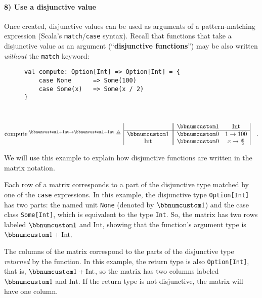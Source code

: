 \paragraph{8) Use a disjunctive value}

Once created, disjunctive values can be used as arguments of a pattern-matching
expression (Scala\textsf{'}s \lstinline!match!/\lstinline!case! syntax).
Recall that functions that take a disjunctive value as an argument
(\textsf{``}\textbf{disjunctive functions}\textsf{''})
may be also written \emph{without} the \lstinline!match! keyword:

\begin{wrapfigure}{l}{0.5\columnwidth}%
\vspace{-0.65\baselineskip}
\begin{lstlisting}
val compute: Option[Int] => Option[Int] = {
    case None      => Some(100)
    case Some(x)   => Some(x / 2)
}
\end{lstlisting}

\vspace{-1.65\baselineskip}
\end{wrapfigure}%

~\vspace{-1.45\baselineskip}
\[
\text{compute}^{:\bbnum 1+\text{Int}\rightarrow\bbnum 1+\text{Int}}\triangleq\,\begin{array}{|c||cc|}
 & \bbnum 1 & \text{Int}\\
\hline \bbnum 1 & \bbnum 0 & 1\rightarrow100\\
\text{Int} & \bbnum 0 & x\rightarrow\frac{x}{2}
\end{array}\quad.
\]
\vspace{-0.9\baselineskip}

We will use this example to explain how disjunctive functions are
written in the matrix notation.

Each row of a matrix corresponds to a part of the disjunctive type
matched by one of the \lstinline!case! expressions. In this example,
the disjunctive type \lstinline!Option[Int]! has two parts: the named
unit \lstinline!None! (denoted by $\bbnum 1$) and the case class
\lstinline!Some[Int]!, which is equivalent to the type \lstinline!Int!.
So, the matrix has two rows labeled $\bbnum 1$ and $\text{Int}$,
showing that the function\textsf{'}s argument type is $\bbnum 1+\text{Int}$.

The columns of the matrix correspond to the parts of the disjunctive
type \emph{returned} by the function. In this example, the return
type is also \lstinline!Option[Int]!, that is, $\bbnum 1+\text{Int}$,
so the matrix has two columns labeled $\bbnum 1$ and $\text{Int}$.
If the return type is not disjunctive, the matrix will have one column.

